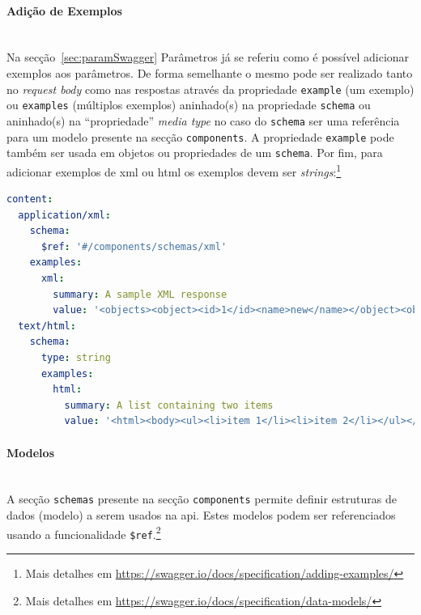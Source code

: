 \paragraph{Adição de Exemplos} \mbox{} \\
Na secção~\ref{sec:paramSwagger} Parâmetros já se referiu como é possível adicionar exemplos aos parâmetros. 
De forma semelhante o mesmo pode ser realizado tanto no \textit{request body} como nas respostas através da 
propriedade \texttt{example} (um exemplo) ou \texttt{examples} (múltiplos exemplos) aninhado(s) na propriedade 
\texttt{schema} ou aninhado(s) na ``propriedade'' \textit{media type} no caso do \texttt{schema} ser uma 
referência para um modelo presente na secção \texttt{components}. A propriedade \texttt{example} pode também ser 
usada em objetos ou propriedades de um \texttt{schema}. Por fim, para adicionar exemplos de \acrshort{xml} ou 
\acrshort{html} os exemplos devem ser \textit{strings}:\footnote{Mais detalhes em \url{https://swagger.io/docs/specification/adding-examples/}}
\begin{lstlisting}[language=yaml, caption=Exemplo de adição de exemplos para \acrshort{xml} e \acrshort{html} na especificação \textit{OpenAPI}]
content:
  application/xml:
    schema:
      $ref: '#/components/schemas/xml'
    examples:
      xml:
        summary: A sample XML response
        value: '<objects><object><id>1</id><name>new</name></object><object><id>2</id></object></objects>'
  text/html:
    schema:
      type: string
      examples:
        html:
          summary: A list containing two items
          value: '<html><body><ul><li>item 1</li><li>item 2</li></ul></body></html>'
\end{lstlisting}

\paragraph{Modelos} \mbox{} \\
A secção \texttt{schemas} presente na secção \texttt{components} permite definir estruturas de dados 
(modelo) a serem usados na \acrshort{api}. 
Estes modelos podem ser referenciados usando a funcionalidade \texttt{\$ref}.\footnote{Mais detalhes em \url{https://swagger.io/docs/specification/data-models/}}

